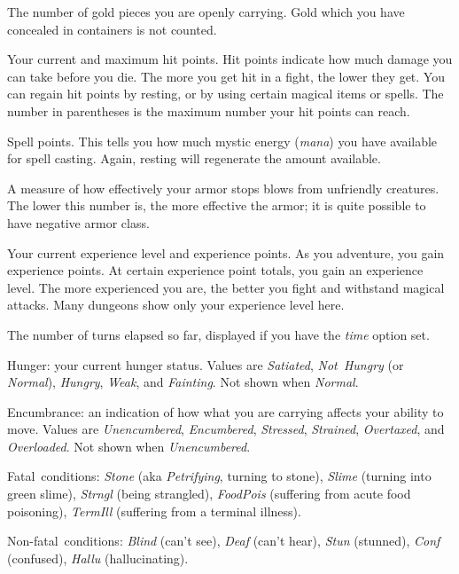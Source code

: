 The number of gold pieces you are openly carrying.  Gold which you have
concealed in containers is not counted.
\item[\bb{Hit Points}]
Your current and maximum hit points.  Hit points indicate how much
damage you can take before you die.  The more you get hit in a fight,
the lower they get.  You can regain hit points by resting, or by using
certain magical items or spells.  The number in parentheses is the maximum
number your hit points can reach.
\item[\bb{Power}]
Spell points.  This tells you how much mystic energy ({\it mana\/})
you have available for spell casting.  Again, resting will regenerate the
amount available.
\item[\bb{Armor Class}]
A measure of how effectively your armor stops blows from unfriendly
creatures.  The lower this number is, the more effective the armor; it
is quite possible to have negative armor class.
\item[\bb{Experience}]
Your current experience level and experience points.  As you
adventure, you gain experience points.  At certain experience point
totals, you gain an experience level.  The more experienced you are,
the better you fight and withstand magical attacks.  Many dungeons
show only your experience level here.
\item[\bb{Time}]
The number of turns elapsed so far, displayed if you have the
{\it time\/} option set.
\item[\bb{Status}]
Hunger:
your current hunger status.
Values are {\it Satiated}, {\it Not~Hungry\/} (or {\it Normal\/}),
{\it Hungry}, {\it Weak}, and {\it Fainting}.
Not shown when {\it Normal}.

Encumbrance:
an indication of how what you are carrying affects your ability to move.
Values are {\it Unencumbered}, {\it Encumbered}, {\it Stressed},
{\it Strained}, {\it Overtaxed}, and {\it Overloaded}.
Not shown when {\it Unencumbered}.

Fatal~conditions:
{\it Stone\/} (aka {\it Petrifying}, turning to stone),
{\it Slime\/} (turning into green slime),
{\it Strngl\/} (being strangled),
{\it FoodPois\/} (suffering from acute food poisoning),
{\it TermIll\/} (suffering from a terminal illness).

Non-fatal~conditions:
{\it Blind\/} (can't see), {\it Deaf\/} (can't hear),
{\it Stun\/} (stunned), {\it Conf\/} (confused), {\it Hallu\/} (hallucinating).

